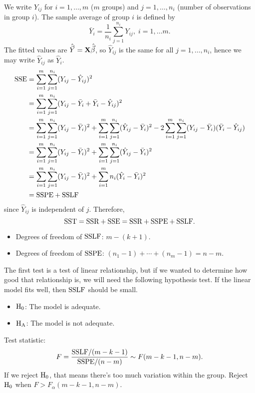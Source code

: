 We write $ Y_{ij} $ for $ i=1,\ldots,m $ ($ m $ groups) and $ j=1,\ldots,n_i $
(number of observations in group $ i $). The sample average of group $ i $ is defined by
\[ \bar{Y}_i=\frac{1}{n_i}\sum_{j=1}^{n_i}Y_{ij},\; i=1,\ldots m. \]
The fitted values are $ \hat{\vec{Y}}=\mathbf{X}\hat{\vec{\beta}} $,
so $ \hat{Y}_{ij} $ is the same for all $ j=1,\ldots,n_i $, hence we may write
$ \hat{Y}_{ij} $ as $ \hat{Y}_i $.
\begin{align*}
    \text{SSE}
     & =\sum_{i=1}^{m}\sum_{j=1}^{n_i}(Y_{ij}-\hat{Y}_{ij})^2                                                       \\
     & =\sum_{i=1}^{m}\sum_{j=1}^{n_i}(Y_{ij}-\bar{Y}_i+\bar{Y}_i-\hat{Y}_{ij})^2                                   \\
     & =\sum_{i=1}^{m}\sum_{j=1}^{n_i}(Y_{ij}-\bar{Y}_i)^2+\sum_{i=1}^{m}\sum_{j=1}^{n_i}(\hat{Y}_{ij}-\bar{Y}_i)^2
    -2 \sum_{i=1}^{m}\sum_{j=1}^{n_i}(Y_{ij}-\bar{Y}_i)(\bar{Y}_i-\hat{Y}_{ij})                                     \\
     & =\sum_{i=1}^{m}\sum_{j=1}^{n_i}(Y_{ij}-\bar{Y}_i)^2+\sum_{i=1}^{m}\sum_{j=1}^{n_i}(\hat{Y}_{ij}-\bar{Y}_i)^2 \\
     & =\sum_{i=1}^{m}\sum_{j=1}^{n_i}(Y_{ij}-\bar{Y}_i)^2+\sum_{i=1}^{m}n_i(\hat{Y}_i-\bar{Y}_i)^2                 \\
     & =\text{SSPE}+\text{SSLF}
\end{align*}
since $ \hat{Y}_{ij} $ is independent of $ j $. Therefore,
\[ \text{SST}=\text{SSR}+\text{SSE}=\text{SSR}+\text{SSPE}+\text{SSLF}. \]
\begin{itemize}
    \item Degrees of freedom of $ \text{SSLF} $: $ m-(k+1) $.
    \item Degrees of freedom of $ \text{SSPE} $: $ (n_1-1)+\cdots+(n_m-1)=n-m $.
\end{itemize}
The first test is a test of linear relationship, but if we wanted to determine
how good that relationship is, we will need the following hypothesis test.
If the linear model fits well, then $ \text{SSLF} $ should be small.
\begin{itemize}
    \item $ \text{H}_0 $: The model is adequate.
    \item $ \text{H}_{\text{A}} $: The model is not adequate.
\end{itemize}
Test statistic:
\[ F=\frac{\text{SSLF}/(m-k-1)}{\text{SSPE}/(n-m)} \sim F(m-k-1,n-m). \]
If we reject $ \text{H}_0 $, that means there's too much variation within the group.
Reject $ \text{H}_0 $ when $ F>F_{\alpha}(m-k-1,n-m) $.
